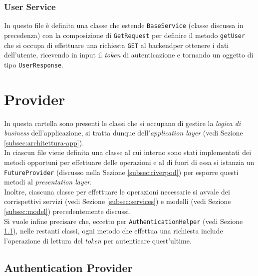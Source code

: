 \subsubsection*{User Service}
\label{subsubsec:user-service}

In questo file è definita una classe che estende \lstinline{BaseService} (classe discussa in precedenza) con la composizione di \lstinline{GetRequest} per definire il metodo \lstinline{getUser} che si occupa di effettuare una richiesta \lstinline{GET} al \gls{backend}\glsoccur per ottenere i dati dell'utente, ricevendo in input il \emph{token} di autenticazione e tornando un oggetto di tipo \lstinline{UserResponse}.

\section{Provider}
\label{sec:provider}

In questa cartella sono presenti le classi che si occupano di gestire la \emph{logica di business} dell'applicazione, si tratta dunque dell'\emph{application layer} (vedi Sezione \ref{subsec:architettura-app}).\\
In ciascun file viene definita una classe al cui interno sono stati implementati dei metodi opportuni per effettuare delle operazioni e al di fuori di essa si istanzia un \lstinline{FutureProvider} \cite{site:future-provider} (discusso nella Sezione \ref{subsec:riverpod}) per esporre questi metodi al \emph{presentation layer}.\\
Inoltre, ciascuna classe per effettuare le operazioni necessarie si avvale dei corrispettivi servizi (vedi Sezione \ref{subsec:services}) e modelli (vedi Sezione \ref{subsec:model}) precedentemente discussi. \\
Si vuole infine precisare che, eccetto per \lstinline{AuthenticationHelper} (vedi Sezione \ref{subsec:authentication-provider}), nelle restanti classi, ogni metodo che effettua una richiesta include l'operazione di lettura del \emph{token} per autenticare quest'ultime.

\subsection{Authentication Provider}
\label{subsec:authentication-provider}

